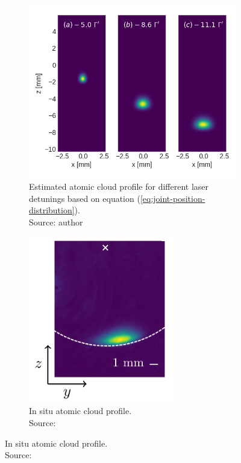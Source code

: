 \begin{figure}[!ht]
    \centering
    \caption{In-situ and estimated atomic cloud profiles from Dreon nMOT}
    \begin{subfigure}[b]{0.5\linewidth}
        \centering
        \includegraphics[width=\textwidth]{USPSC-img/dy_dreon_cloud_profile.png}
        \caption{Estimated atomic cloud profile for different laser detunings based on equation (\ref{eq:joint-position-distribution}). \\ Source: author}
        \label{fig:Dreon-simulated-atomic-cloud-profile}
    \end{subfigure}
    \hspace{20px}
    \begin{subfigure}[b]{0.4\linewidth}
        \centering
        \includegraphics[width=0.7\textwidth]{USPSC-img/in-situ-atomic-cloud-Dreon.png}
        \caption{In situ atomic cloud profile. \\ Source: \cite{dreon2017designing}}
        \vspace{35px}
        \label{fig:Dreon-in-situ-atomic-cloud-profile}
    \end{subfigure}
\end{figure}

